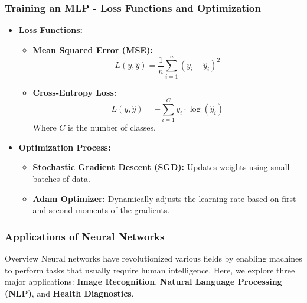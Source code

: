 \documentclass[aspectratio=169]{beamer}
\begin{document}
\begin{frame}[fragile]
    \frametitle{Training an MLP - Loss Functions and Optimization}
    \begin{itemize}
        \item \textbf{Loss Functions:}
        \begin{itemize}
            \item \textbf{Mean Squared Error (MSE):}
            \begin{equation}
                L(y, \hat{y}) = \frac{1}{n}\sum_{i=1}^{n} (y_i - \hat{y}_i)^2
            \end{equation}
            \item \textbf{Cross-Entropy Loss:}
            \begin{equation}
                L(y, \hat{y}) = -\sum_{i=1}^{C} y_i \cdot \log(\hat{y}_i)
            \end{equation}
            Where $C$ is the number of classes.
        \end{itemize}
        \item \textbf{Optimization Process:}
        \begin{itemize}
            \item \textbf{Stochastic Gradient Descent (SGD):} Updates weights using small batches of data.
            \item \textbf{Adam Optimizer:} Dynamically adjusts the learning rate based on first and second moments of the gradients.
        \end{itemize}
    \end{itemize}
\end{frame}

\begin{frame}[fragile]
    \frametitle{Applications of Neural Networks}
    \begin{block}{Overview}
        Neural networks have revolutionized various fields by enabling machines to perform tasks that usually require human intelligence. Here, we explore three major applications: \textbf{Image Recognition}, \textbf{Natural Language Processing (NLP)}, and \textbf{Health Diagnostics}.
    \end{block}
\end{frame}
\end{document}
